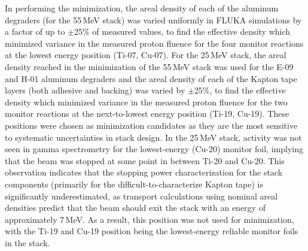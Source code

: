 In performing the  minimization, the areal density of each of the  aluminum degraders (for the 55\,MeV stack)  was varied uniformly in FLUKA simulations  by a factor of up to $\pm$25\% of measured
values, to find the effective density which minimized variance in the measured proton fluence for the four monitor reactions at the lowest energy position (Ti-07, Cu-07).
For the 25\,MeV stack, the areal density reached in the minimization of the 55\,MeV stack was used for  the E-09 and H-01 aluminum degraders
and the areal density of each of the  Kapton tape  layers (both adhesive and backing)  was 
varied 
by 
$\pm$25\%, 
to find the effective density which minimized variance in the measured proton fluence for the two monitor reactions at the next-to-lowest energy position (Ti-19, Cu-19).
These 
positions were chosen as  minimization candidates as they are the most sensitive to systematic uncertainties in stack design.
In the 25\,MeV stack, activity was not seen in gamma spectrometry for the lowest-energy (Cu-20) monitor foil, implying that the beam was stopped at some point in between Ti-20 and Cu-20.
This observation 
indicates that  the stopping power characterization
for the stack components 
(primarily for the difficult-to-characterize Kapton tape) is significantly underestimated, as transport calculations using nominal areal densities predict that the beam should exit the stack 
with an energy of approximately 7\,MeV.
As a result, this position was not used for minimization, with the Ti-19 and Cu-19 position being the lowest-energy reliable monitor foils in the stack.
% 
% 
% 

